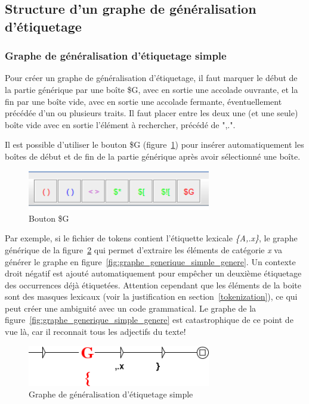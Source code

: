 \subsection{Structure d'un graphe de g\'{e}n\'{e}ralisation d'\'{e}tiquetage}

\subsubsection{Graphe de généralisation d'étiquetage simple}

Pour créer un graphe de généralisation d'étiquetage, il faut marquer le début de la partie générique par une boîte \$G, avec en sortie une accolade ouvrante, et la fin par une boîte vide, avec en sortie une accolade fermante, éventuellement précédée d'un ou plusieurs traits. Il faut placer entre les deux une (et une seule) boîte vide avec en sortie l'élément à rechercher, précédé de ",.".

\bigskip
Il est possible d'utiliser le bouton \$G (figure~\ref{fig:bouton_g}) pour insérer automatiquement les boîtes de début et de fin de la partie générique après avoir sélectionné une boîte.

\begin{figure}[!htb]
  \centering
  \includegraphics[width=8cm]{resources/img/bouton_g.png}
  \caption{Bouton \$G}
  \label{fig:bouton_g}
\end{figure}

\bigskip
Par exemple, si le fichier de tokens contient l'étiquette lexicale \emph{\{A,.x\}}, le graphe générique de la figure~\ref{fig:graphe_generique_simple} qui permet d'extraire les éléments de catégorie \textit{x} va générer le graphe en figure~\ref{fig:graphe_generique_simple_genere}. Un contexte droit négatif est ajouté automatiquement pour empêcher un deuxième étiquetage des occurrences déjà étiquetées. Attention cependant que les éléments de la boite sont des masques lexicaux (voir la justification en section~\ref{tokenization}), ce qui peut créer une ambiguité avec un code grammatical. Le graphe de la figure~\ref{fig:graphe_generique_simple_genere} est catastrophique de ce point de vue là, car il reconnait tous les adjectifs du texte!

\begin{figure}[!htb]
  \centering
  \includegraphics[width=8cm]{resources/img/graphe_generique_simple.png}
  \caption{Graphe de généralisation d'étiquetage simple}
  \label{fig:graphe_generique_simple}
\end{figure}

